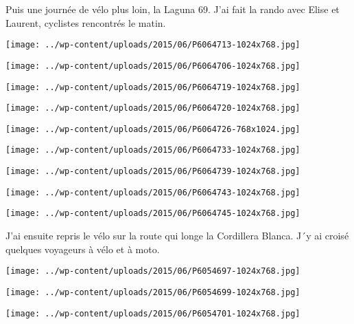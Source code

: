 Puis une journée de vélo plus loin, la Laguna 69. J'ai fait la rando avec Elise et Laurent, cyclistes rencontrés le matin. 
\begin{center} \texttt{[image: ../wp-content/uploads/2015/06/P6064713-1024x768.jpg]} \end{center}
\begin{center} \texttt{[image: ../wp-content/uploads/2015/06/P6064706-1024x768.jpg]} \end{center}
\begin{center} \texttt{[image: ../wp-content/uploads/2015/06/P6064719-1024x768.jpg]} \end{center}
\begin{center} \texttt{[image: ../wp-content/uploads/2015/06/P6064720-1024x768.jpg]} \end{center}
\begin{center} \texttt{[image: ../wp-content/uploads/2015/06/P6064726-768x1024.jpg]} \end{center}
\begin{center} \texttt{[image: ../wp-content/uploads/2015/06/P6064733-1024x768.jpg]} \end{center}
\begin{center} \texttt{[image: ../wp-content/uploads/2015/06/P6064739-1024x768.jpg]} \end{center}
\begin{center} \texttt{[image: ../wp-content/uploads/2015/06/P6064743-1024x768.jpg]} \end{center}
\begin{center} \texttt{[image: ../wp-content/uploads/2015/06/P6064745-1024x768.jpg]} \end{center}
\pagebreak

J'ai ensuite repris le vélo sur la route qui longe la Cordillera Blanca. J´y ai croisé quelques voyageurs à vélo et à moto. 
\begin{center} \texttt{[image: ../wp-content/uploads/2015/06/P6054697-1024x768.jpg]} \end{center}
\begin{center} \texttt{[image: ../wp-content/uploads/2015/06/P6054699-1024x768.jpg]} \end{center}
\begin{center} \texttt{[image: ../wp-content/uploads/2015/06/P6054701-1024x768.jpg]} \end{center}

